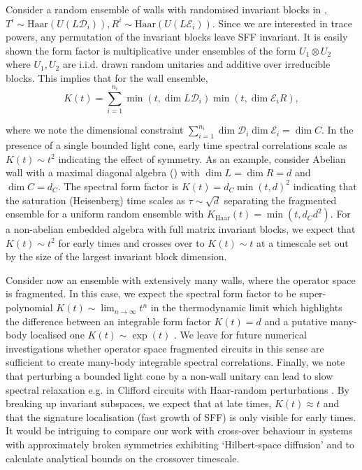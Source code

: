 \documentclass[11pt, twocolumn, floatfix, superscriptaddress, aps, prb, raggedbottom]{revtex4-2}
\begin{document}
Consider a random ensemble of walls with randomised invariant blocks in , $T^i \sim \mathrm{Haar}(U(L\mathcal{D}_i)), R^i \sim \mathrm{Haar}(U(L\mathcal{E}_i))$. Since we are interested in trace powers, any permutation of the invariant blocks leave SFF invariant.  It is easily shown the form factor is multiplicative under ensembles of the form $U_1 \otimes U_2$ where $U_1, U_2$ are i.i.d. drawn random unitaries and additive over irreducible blocks.
This implies that for the wall ensemble, 
\begin{equation}
    K(t)  = \sum_{i = 1}^{n_i} \min(t, \dim L\mathcal{D}_i) \min(t, \dim \mathcal{E}_iR), 
\end{equation}

\noindent where we note the dimensional constraint $\sum_{i=1}^{n_i} \dim\mathcal{D}_i \dim\mathcal{E}_i = \dim C$. In the presence of a single bounded light cone, early time spectral correlations scale as $K(t)\sim t^2$ indicating the effect of symmetry. As an example, consider Abelian wall with a maximal diagonal algebra () with $\dim L = \dim R = d$ and $\dim C = d_C$. The spectral form factor is $K(t) = d_C \min(t, d)^2$ indicating that the saturation (Heisenberg) time scales as $\tau \sim \sqrt{d}$ separating the fragmented ensemble for a uniform random ensemble with $K_{\mathrm{Haar}}(t) = \min(t, d_C d^2)$. For a non-abelian embedded algebra with full matrix invariant blocks, we expect that $K(t) \sim t^2$ for early times and crosses over to $K(t) \sim t$ at a timescale set out by the size of the largest invariant block dimension. 

Consider now an ensemble with extensively many walls, where the operator space is fragmented. In this case, we expect the spectral form factor to be super-polynomial $K(t) \sim \lim_{n\rightarrow\infty} t^n$ in the thermodynamic limit which highlights the difference between an integrable form factor $K(t) = d$ and a putative many-body localised one $K(t) \sim \exp(t)$ \cite{Chan2018, Chan2021SpectralLyapunov, Chan2018}. We leave for future numerical investigations whether operator space fragmented circuits in this sense are sufficient to create many-body integrable spectral correlations. Finally, we note that perturbing a bounded light cone by a non-wall unitary can lead to slow spectral relaxation e.g. in Clifford circuits with Haar-random perturbations \cite{Kovacs2026}. By breaking up invariant subspaces, we expect that at late times, $K(t) \approx t$ and that the signature localisation (fast growth of SFF) is only visible for early times. It would be intriguing to compare our work with cross-over behaviour in systems with approximately broken symmetries exhibiting \enquote*{Hilbert-space diffusion} \cite{BaumgartnerDelacretazNayakSonner2024HilbertSpaceDiffusion} and to calculate analytical bounds on the crossover timescale.   
\end{document}
